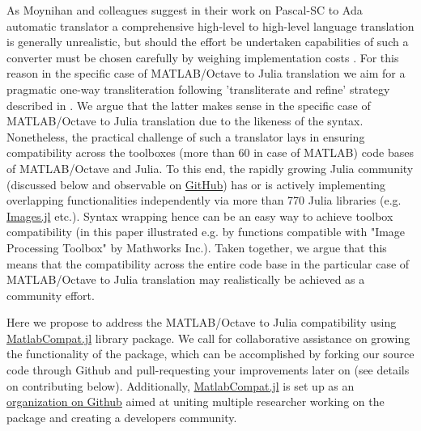 As Moynihan and colleagues suggest in their work on Pascal-SC to Ada automatic translator a comprehensive high-level to high-level language translation is generally unrealistic, but should the effort be undertaken capabilities of such a converter must be chosen carefully by weighing implementation costs \cite{Moynihan_1991}. For this reason in the specific case of MATLAB/Octave to Julia translation we aim for a pragmatic one-way transliteration following 'transliterate and refine' strategy described in \cite{Waters_1988}. We argue that the latter makes sense in the specific case of MATLAB/Octave to Julia translation due to the likeness of the syntax. Nonetheless, the practical challenge of such a translator lays in ensuring compatibility across the toolboxes (more than 60 in case of MATLAB) code bases of MATLAB/Octave and Julia. To this end, the rapidly growing Julia community (discussed below and observable on \href{https://github.com/JuliaLang/METADATA.jl/graphs/commit-activity}{GitHub}) has or is actively implementing overlapping functionalities independently via more than 770 Julia libraries (e.g. \href{https://github.com/timholy/Images.jl}{Images.jl} etc.). Syntax wrapping hence can be an easy way to achieve toolbox compatibility (in this paper illustrated e.g. by functions compatible with "Image Processing Toolbox" by Mathworks Inc.). Taken together, we argue that this means that the compatibility across the entire code base in the particular case of MATLAB/Octave to Julia translation may realistically be achieved as a community effort.

Here we propose to address the MATLAB/Octave to Julia compatibility using \href{https://github.com/MatlabCompat/MatlabCompat.jl}{MatlabCompat.jl} library package. We call for collaborative assistance on growing the functionality of the package, which can be accomplished by forking our source code through Github and pull-requesting your improvements later on (see details on contributing below). Additionally, \href{http://matlabcompat.github.io/}{MatlabCompat.jl} is set up as an \href{https://github.com/MatlabCompat}{organization on Github} aimed at uniting multiple researcher working on the package and creating a developers community.
  
  
  
  
  